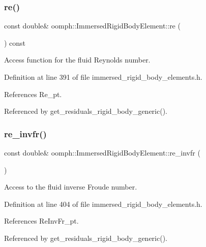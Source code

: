 \subsubsection{\texorpdfstring{re()}{re()}}
{\footnotesize\ttfamily const double\& oomph\+::\+Immersed\+Rigid\+Body\+Element\+::re (\begin{DoxyParamCaption}{ }\end{DoxyParamCaption}) const\hspace{0.3cm}{\ttfamily [inline]}}



Access function for the fluid Reynolds number. 



Definition at line 391 of file immersed\+\_\+rigid\+\_\+body\+\_\+elements.\+h.



References Re\+\_\+pt.



Referenced by get\+\_\+residuals\+\_\+rigid\+\_\+body\+\_\+generic().

\mbox{\label{classoomph_1_1ImmersedRigidBodyElement_ad5082011e8c4db0def4044b05314d149}} 
\subsubsection{\texorpdfstring{re\+\_\+invfr()}{re\_invfr()}}
{\footnotesize\ttfamily const double\& oomph\+::\+Immersed\+Rigid\+Body\+Element\+::re\+\_\+invfr (\begin{DoxyParamCaption}{ }\end{DoxyParamCaption})\hspace{0.3cm}{\ttfamily [inline]}}



Access to the fluid inverse Froude number. 



Definition at line 404 of file immersed\+\_\+rigid\+\_\+body\+\_\+elements.\+h.



References Re\+Inv\+Fr\+\_\+pt.



Referenced by get\+\_\+residuals\+\_\+rigid\+\_\+body\+\_\+generic().

